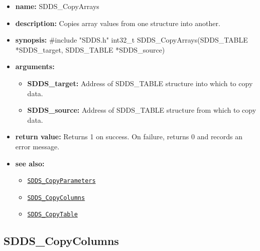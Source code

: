 \documentclass[11pt]{article}
\newcommand{\progref}[1]{\hyperref[SDDS_#1]{\tt SDDS\_#1}}
\begin{document}
\begin{itemize}
\item {\bf name:}\newline
SDDS\_CopyArrays
\item {\bf description:}\newline
Copies array values from one structure into another.
\item {\bf synopsis:} \#include "SDDS.h"\newline
int32\_t SDDS\_CopyArrays(SDDS\_TABLE *SDDS\_target, SDDS\_TABLE *SDDS\_source)
\item {\bf arguments:}
\begin{itemize}
\item {\bf SDDS\_target:} Address of SDDS\_TABLE structure into which to copy data.
\item {\bf SDDS\_source:} Address of SDDS\_TABLE structure from which to copy data.
\end{itemize}
\item {\bf return value:}\newline
Returns 1 on success. On failure, returns 0 and records an error message.
\item {\bf see also:}
\begin{itemize}
\item \progref{CopyParameters}
\item \progref{CopyColumns}
\item \progref{CopyTable}
\end{itemize}
\end{itemize}

\subsection{SDDS\_CopyColumns}
\label{SDDS_CopyColumns}
\end{document}
